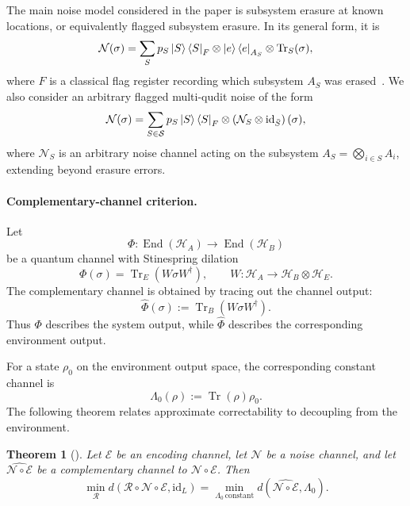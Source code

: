 \documentclass[10pt,twocolumn,superscriptaddress,aps,amsmath,amssymb,citeautoscript,floatfix,prx]{revtex4-2}
\newtheorem{theorem}{Theorem}
\theoremstyle{plain}
\theoremstyle{plain}
\theoremstyle{plain}
\theoremstyle{plain}
\theoremstyle{plain}
\theoremstyle{plain}
\begin{document}
The main noise model considered in the paper is subsystem erasure at known locations, or equivalently flagged subsystem erasure. In its general form, it is
\begin{equation}\label{eq:erasure_noise}
\mathcal N(\sigma)
=
\sum_S
p_S
\ket S\bra S_F
\otimes
\ket e\bra e_{A_S}
\otimes
\operatorname{Tr}_S(\sigma),
\end{equation}
where $F$ is a classical flag register recording which subsystem $A_S$ was erased~\cite{Faist2020}. We also consider an arbitrary flagged multi-qudit noise of the form
\begin{equation}\label{eq:arbitrary_multiqudit_noise}
\mathcal N(\sigma)
=
\sum_{S\in\mathcal S}
p_S
\ket S\bra S_F
\otimes
\left(
\mathcal N_S
\otimes
\mathrm{id}_{\bar S}
\right)(\sigma),
\end{equation}
where $\mathcal N_S$ is an arbitrary noise channel acting on the subsystem $A_S=\bigotimes_{i\in S}A_i$, extending beyond erasure errors.

\paragraph{Complementary-channel criterion.}

Let
$$
\Phi:\operatorname{End}(\mathcal H_A)\to\operatorname{End}(\mathcal H_B)
$$
be a quantum channel with Stinespring dilation
$$
\Phi(\sigma)
=
\operatorname{Tr}_E(W\sigma W^\dagger),
\qquad
W:\mathcal H_A\to\mathcal H_B\otimes\mathcal H_E .
$$
The complementary channel is obtained by tracing out the channel output:
$$
\widehat\Phi(\sigma)
:=
\operatorname{Tr}_B(W\sigma W^\dagger).
$$
Thus $\Phi$ describes the system output, while $\widehat\Phi$ describes the corresponding environment output.

For a state $\rho_0$ on the environment output space, the corresponding constant channel is
\begin{equation}\label{eq:constant_channel_def}
\Lambda_0(\rho)
:=
\operatorname{Tr}(\rho)\rho_0 .
\end{equation}
The following theorem relates approximate correctability to decoupling from the environment.

\begin{theorem}[\citet{Beny2010}]\label{thm:beny}
Let $\mathcal E$ be an encoding channel, let $\mathcal N$ be a noise channel, and let $\widehat{\mathcal N\circ\mathcal E}$ be a complementary channel to $\mathcal N\circ\mathcal E$. Then
\begin{equation}\label{eq:beny}
    \min_{\mathcal R}
    d\left(
        \mathcal R\circ\mathcal N\circ\mathcal E,
        \mathrm{id}_L
    \right)
    =
    \min_{\Lambda_0\,\mathrm{constant}}
    d\left(
        \widehat{\mathcal N\circ\mathcal E},
        \Lambda_0
    \right).
\end{equation}
\end{theorem}
\end{document}
